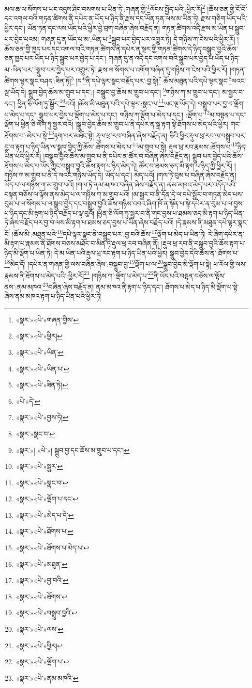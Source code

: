 མལ་ཆ་ལ་སོགས་པ་ཡང་འདུས་ཤིང་བསགས་པ་ཡིན་ཏེ་:གཞན་གྱི་\footnote{«སྣར་»«པེ་»གཞན་གྱིས་}ལོངས་སྤྱོད་པའི་:ཕྱིར་རོ།\footnote{«སྣར་»«པེ་»ཕྱིར།} །ཆོས་ཅན་གྱི་ངོ་བོ་དང་འགལ་བའི་གཏན་ཚིགས་ནི་དཔེར་ན་ཡོད་པ་ཉིད་ནི་རྫས་དང་ཡོན་ཏན་ལས་མ་ཡིན་ཏེ། རྫས་གཅིག་ཡོད་པའི་ཕྱིར་དང་། ཡོན་ཏན་དང་ལས་ཡོད་པའི་ཕྱིར་བྱེ་བྲག་བཞིན་ཞེས་བརྗོད་ན། གཏན་ཚིགས་འདི་རྫས་མ་ཡིན་པ་སྒྲུབ་པར་བྱེད་པའམ། གཞན་དུ་ན་ཡོད་པ་མ་:ཡིན་པ་\footnote{«སྣར་»«པེ་»ཡིན་}སྒྲུབ་པར་བྱེད་པར་འགྱུར་ཏེ། དེ་གཉིས་ཀ་ངེས་པའི་ཕྱིར་རོ། །ཆོས་ཅན་གྱི་ཁྱད་པར་དང་འགལ་བའི་གཏན་ཚིགས་ནི་དཔེར་ན་སྔར་གྱི་གཏན་ཚིགས་དེ་ཉིད་བསྒྲུབ་བྱའི་ཆོས་ཅན་ཁྱད་པར་ཡོད་པ་ཉིད་སྒྲུབ་པར་བྱེད་པ་དང་། གཞན་དུ་ན་འདི་དང་འགལ་བའི་སྒྲུབ་པར་བྱེད་པ་ཡོད་པ་ཉིད་མ་:ཡིན་པར་\footnote{«སྣར་»«པེ་»ཡིན་པ་}སྒྲུབ་པར་བྱེད་པར་འགྱུར་ཏེ། རྫས་ལ་སོགས་པ་འགོག་བཞིན་དུ་གཉིས་ཀ་ངེས་པའི་ཕྱིར་རོ། །གཏན་ཚིགས་ལྟར་སྣང་བཤད་:ཟིན་ཏོ།\footnote{«སྣར་»«པེ་»ཟིན་ཏེ།} །ད་\footnote{«པེ་»དེ་}ནི་དཔེ་ལྟར་སྣང་བརྗོད་པར་:བྱ་སྟེ།\footnote{«སྣར་»«པེ་»བྱས་ཏེ།} ཆོས་མཐུན་པའི་དཔེ་ལྟར་སྣང་\footnote{«སྣར་»སྣང་བ་}ལའང་ལྔ་ཡོད་དེ། སྒྲུབ་བྱེད་ཆོས་མ་གྲུབ་པ་དང་:། བསྒྲུབ་བྱ་ཆོས་མ་གྲུབ་པ་དང་། \footnote{«སྣར་»།  «པེ་»། སྒྲུབ་བྱ་དང་ཆོས་མ་གྲུབ་པ་དང་། }གཉིས་ཀ་མ་གྲུབ་པ་དང་། མ་སྦྱར་བ་དང་། ཕྱིན་ཅི་ལོག་ཏུ་སྦྱོར་\footnote{«སྣར་»«པེ་»སྦྱར་}བའོ། །ཆོས་མི་མཐུན་པའི་དཔེ་ལྟར་:སྣང་ལ་\footnote{«སྣར་»«པེ་»སྣང་བ་}ཡང་ལྔ་ཡོད་དེ། བསྒྲུབ་པར་བྱ་བ་ལྡོག་པ་མེད་པ་དང་། སྒྲུབ་པར་བྱེད་པ་ལྡོག་པ་མེད་པ་དང་། གཉིས་ཀ་ལྡོག་པ་མེད་པ་དང་། :ལྡོག་པ་\footnote{«སྣར་»«པེ་»ལྡོག་པ་དང་}མ་བསྟན་པ་དང་། ལྡོག་པ་ཕྱིན་ཅི་ལོག་ཏུ་སྦྱར་བའོ། །སྒྲུབ་བྱེད་ཆོས་མ་གྲུབ་པ་ནི་དཔེར་ན་སྒྲ་རྟག་སྟེ་ཐོགས་པ་མེད་པའི་ཕྱིར། གང་ཐོགས་པ་:མེད་པ་སྟེ་\footnote{«སྣར་»«པེ་»མེད་པ་དེ་}རྟག་པར་མཐོང་སྟེ། རྡུལ་ཕྲ་རབ་བཞིན་ཞེས་བརྗོད་ན། ཅིའི་ཕྱིར་རྡུལ་ཕྲ་རབ་ལ་བསྒྲུབ་པར་བྱ་བ་རྟག་པ་ཉིད་ཡིན་ལ་སྒྲུབ་བྱེད་ཀྱི་ཆོས་:ཐོགས་པ་མེད་པ་\footnote{«སྣར་»«པེ་»ཐོགས་པ་}མ་གྲུབ་པ་སྟེ། རྡུལ་ཕྲ་རབ་རྣམས་:ཐོགས་པ་\footnote{«སྣར་»«པེ་»ཐོགས་པ་མེད་པ་}ཉིད་ཡིན་པའི་ཕྱིར་རོ། །བསྒྲུབ་བྱའི་ཆོས་མ་གྲུབ་པ་ནི་དཔེར་ན་ཚོར་བ་བཞིན་ཞེས་བརྗོད་ན། སྒྲུབ་པར་བྱེད་པའི་ཆོས་ཐོགས་པ་མེད་པ་ཡོད་ཀྱང་བསྒྲུབ་བྱའི་ཆོས་རྟག་པ་ཉིད་མེད་དེ། ཚོར་བ་ཐམས་ཅད་མི་རྟག་པ་ཉིད་ཀྱི་ཕྱིར་རོ། །གཉིས་ཀ་མ་གྲུབ་པ་ནི་དེ་ལའང་གཉིས་ཡོད་དེ། ཡོད་པ་དང་། མེད་པའོ། །གལ་ཏེ་བུམ་པ་བཞིན་ཞེས་བརྗོད་ན། ཡོད་པ་ལ་གཉིས་ཀ་མ་གྲུབ་པའོ། །གལ་ཏེ་ནམ་མཁའ་བཞིན་ཞེས་བརྗོད་ན། ནམ་མཁའ་མེད་པར་འདོད་པའི་བསྟན་བཅོས་ལ་ལྟོས་ནས་མེད་པ་ལ་གཉིས་ཀ་མ་གྲུབ་པའོ། །མ་སྦྱར་བ་ནི་དོན་དེ་ལ་དཔེ་སྦྱོར་བ་གཏན་མེད་པས་བུམ་པ་ལ་སོགས་པ་ལ་སྒྲུབ་བྱེད་དང་བསྒྲུབ་བྱའི་ཆོས་གཉིས་འབའ་ཞིག་ཁོ་ན་སྟོན་པ་སྟེ་དཔེར་ན་བུམ་པ་ལ་བྱས་པ་ཉིད་དང་མི་རྟག་པ་ཉིད་བརྗོད་པ་ལྟ་བུའོ། །ཕྱིན་ཅི་ལོག་ཏུ་སྦྱར་བ་ནི་གང་བྱས་པ་ཐམས་ཅད་མི་རྟག་པ་ཉིད་ཡིན་ཏེ་ཞེས་བརྗོད་པར་བྱ་བ་ལས་མི་རྟག་པ་ཐམས་ཅད་བྱས་པ་ཡིན་ཞེས་བརྗོད་པའོ། །དེ་རྣམས་ནི་མཐུན་དཔེ་ལྟར་སྣང་ངོ། །ཆོས་མི་:མཐུན་པའི་\footnote{«སྣར་»«པེ་»མཐུན་}དཔེ་ལྟར་སྣང་ནི་བསྒྲུབ་པར་:བྱ་བའི་ཆོས་\footnote{«སྣར་»«པེ་»བྱ་བའི་}ལྡོག་པ་མེད་པ་ཡིན་ཏེ། རེ་ཞིག་དཔེར་ན་མི་རྟག་པ་རྣམས་ནི་ཐོགས་བཅས་མཐོང་བ་མིན་ཏེ་རྡུལ་ཕྲ་རབ་བཞིན་ནོ། །རྡུལ་ཕྲ་རབ་ནི་བསྒྲུབ་བྱའི་ཆོས་རྟག་པ་ཉིད་མི་ལྡོག་པ་ཡིན་ཏེ། དེ་མ་ཡིན་པའི་རྡུལ་ཕྲ་རབ་རྟག་པ་ཉིད་ཡིན་པའི་ཕྱིར། སྒྲུབ་བྱེད་དེའི་ཆོས་ནི་:ཐོགས་པ་\footnote{«སྣར་»«པེ་»ཐོགས་}མེད་དོ། །དཔེར་ན་གཞན་གྱི་ལས་བཞིན་ཞེས་:བསྒྲུབ་བྱ་\footnote{«སྣར་»«པེ་»བསྒྲུབ་བྱའི་}ལྡོག་པ་ལ་\footnote{«སྣར་»«པེ་»ལས་}སྒྲུབ་བྱེད་མི་ལྡོག་པ་སྟེ། ཕ་རོལ་གྱི་ལས་རྣམས་ནི་ཐོགས་པ་མེད་པའི་:ཕྱིར་རོ།\footnote{«སྣར་»«པེ་»ཕྱིར།} །གཉིས་ཀ་:ལྡོག་པ་མེད་པ་\footnote{«སྣར་»«པེ་»ལྡོག་པ་}ནི་ཡོད་པའི་བསྟན་བཅོས་ལ་ལྟོས་ནས་:ནམ་མཁའ་\footnote{«སྣར་»«པེ་»ནམ་མཁའི་}བཞིན་ཞེས་བརྗོད་ན། ནམ་མཁའ་ནི་རྟག་པ་ཉིད་དང་། ཐོགས་པ་མེད་པ་ཉིད་མི་ལྡོག་པ་སྟེ་ཞེས་ནམ་མཁའ་རྟག་པ་ཉིད་ཡིན་པའི་ཕྱིར་ཏེ། 